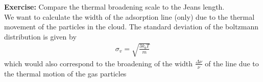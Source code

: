 \documentclass[paper=a4, fontsize=11pt]{scrartcl} %
\numberwithin{figure}{section} %
\numberwithin{table}{section} %
\begin{document}
\textbf{Exercise:} Compare the thermal broadening scale to the Jeans length. \\

We want to calculate the width of the adsorption line (only) due to the thermal movement of the particles in the cloud. The standard deviation of the boltzmann distribution is given by
\begin{align*}
\sigma_v = \sqrt{\frac{3k_bT}{m}} 
\end{align*}
which would also correspond to the broadening of the width $\frac{\Delta \nu}{\nu}$ of the line due to the thermal motion of the gas particles





\end{document}
